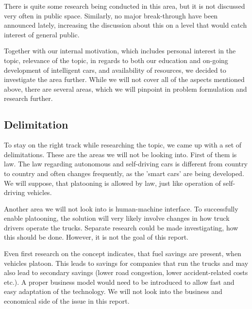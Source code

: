 % 
There is quite some research being conducted in this area, but it is not discussed very often in public space. Similarly, no major break-through have been announced lately, increasing the discussion about this on a level that would catch interest of general public.\par
% 
Together with our internal motivation, which includes personal interest in the topic, relevance of the topic, in regards to both our education and on-going development of intelligent cars, and availability of resources, we decided to investigate the area further. While we will not cover all of the aspects mentioned above, there are several areas, which we will pinpoint in problem formulation and research further.\par
%

% 
\subsection{Delimitation}
To stay on the right track while researching the topic, we came up with a set of delimitations. These are the areas we will not be looking into. First of them is law. The law regarding autonomous and self-driving cars is different from country to country and often changes frequently, as the 'smart cars' are being developed. We will suppose, that platooning is allowed by law, just like operation of self-driving vehicles.\par
Another area we will not look into is human-machine interface. To successfully enable platooning, the solution will very likely involve changes in how truck drivers operate the trucks. Separate research could be made investigating, how this should be done. However, it is not the goal of this report.\par
Even first research on the concept indicates, that fuel savings are present, when vehicles platoon. This leads to savings for companies that run the trucks and may also lead to secondary savings (lower road congestion, lower accident-related costs etc.). A proper business model would need to be introduced to allow fast and easy adaptation of the technology. We will not look into the business and economical side of the issue in this report.
% 
